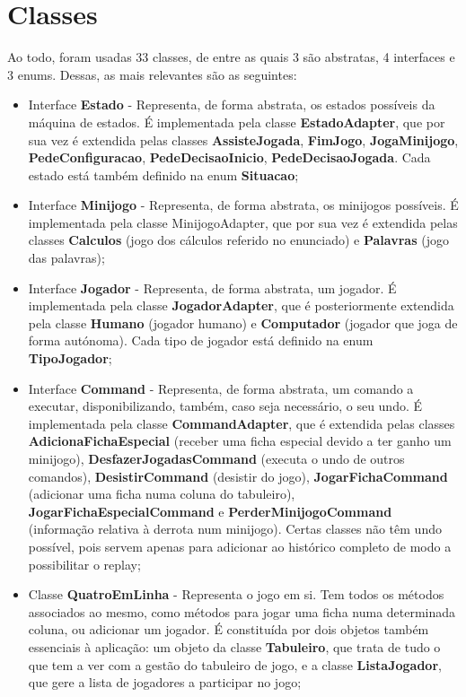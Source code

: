\documentclass[11pt]{article}
\begin{document}
	\pagebreak
	
	\large
	\section{Classes}
	\normalsize
	
	Ao todo, foram usadas 33 classes, de entre as quais 3 são abstratas, 4 interfaces e 3 enums. Dessas, as mais relevantes são as seguintes: 
	
	\begin{itemize}
		\item Interface \textbf{Estado} - Representa, de forma abstrata, os estados possíveis da máquina de estados. É implementada pela classe \textbf{EstadoAdapter}, que por sua vez é extendida pelas classes \textbf{AssisteJogada}, \textbf{FimJogo}, \textbf{JogaMinijogo}, \textbf{PedeConfiguracao}, \textbf{PedeDecisaoInicio}, \textbf{PedeDecisaoJogada}. Cada estado está também definido na enum \textbf{Situacao};
		\item Interface \textbf{Minijogo} - Representa, de forma abstrata, os minijogos possíveis. É implementada pela classe MinijogoAdapter, que por sua vez é extendida pelas classes \textbf{Calculos} (jogo dos cálculos referido no enunciado) e \textbf{Palavras} (jogo das palavras);
		\item Interface \textbf{Jogador} - Representa, de forma abstrata, um jogador. É implementada pela classe \textbf{JogadorAdapter}, que é posteriormente extendida pela classe \textbf{Humano} (jogador humano) e \textbf{Computador} (jogador que joga de forma autónoma). Cada tipo de jogador está definido na enum \textbf{TipoJogador};
		\item Interface \textbf{Command} - Representa, de forma abstrata, um comando a executar, disponibilizando, também, caso seja necessário, o seu undo. É implementada pela classe \textbf{CommandAdapter}, que é extendida pelas classes \textbf{AdicionaFichaEspecial} (receber uma ficha especial devido a ter ganho um minijogo), \textbf{DesfazerJogadasCommand} (executa o undo de outros comandos), \textbf{DesistirCommand} (desistir do jogo), \textbf{JogarFichaCommand} (adicionar uma ficha numa coluna do tabuleiro), \textbf{JogarFichaEspecialCommand} e \textbf{PerderMinijogoCommand} (informação relativa à derrota num minijogo). Certas classes não têm undo possível, pois servem apenas para adicionar ao histórico completo de modo a possibilitar o replay;
		\item Classe \textbf{QuatroEmLinha} - Representa o jogo em si. Tem todos os métodos associados ao mesmo, como métodos para jogar uma ficha numa determinada coluna, ou adicionar um jogador. É constituída por dois objetos também essenciais à aplicação: um objeto da classe \textbf{Tabuleiro}, que trata de tudo o que tem a ver com a gestão do tabuleiro de jogo, e a classe \textbf{ListaJogador}, que gere a lista de jogadores a participar no jogo;

\end{itemize}
\end{document}
